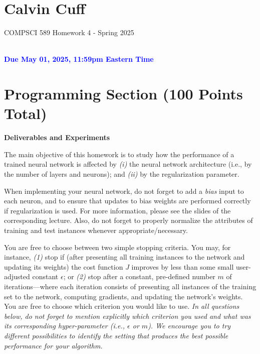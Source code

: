 \documentclass[letterpaper]{article}
\newcommand{\HIGHLIGHT}[1]{\textcolor{blue}{\textbf{#1}}}
\begin{document}
\newpage
\section*{Calvin Cuff}
\begin{center}
    \begin{Large}
    COMPSCI 589 Homework 4 - Spring 2025
    \end{Large}
    \\
    \HIGHLIGHT{Due May 01, 2025, 11:59pm Eastern Time}
\end{center}



\section*{Programming Section (100 Points Total)}

\textbf{Deliverables and Experiments}

The main objective of this homework is to study how the performance of a trained neural network is affected by \textit{(i)} the neural network architecture (i.e., by the number of layers and neurons); and \textit{(ii)} by the regularization parameter. 

When implementing your neural network, do not forget to add a \textit{bias} input to each neuron, and to ensure that updates to bias weights are performed correctly if regularization is used. For more information, please see the slides of the corresponding lecture. Also, do not forget to properly normalize the attributes of training and test instances whenever appropriate/necessary. 

You are free to choose between two simple stopping criteria. You may, for instance, \textit{(1)} stop if (after presenting all training instances to the network and updating its weights) the cost function $J$ improves by less than some small user-adjusted constant $\epsilon$; or  \textit{(2)} stop after a constant, pre-defined number $m$ of iterations---where each iteration consists of presenting all instances of the training set to the network, computing gradients, and updating the network's weights. You are free to choose which criterion you would like to use. \textit{In all questions below, do not forget to mention explicitly which criterion you used and what was its corresponding hyper-parameter (i.e., $\epsilon$ or $m$). We encourage you to try different possibilities to identify the setting that produces the best possible performance for your algorithm.}
\end{document}

